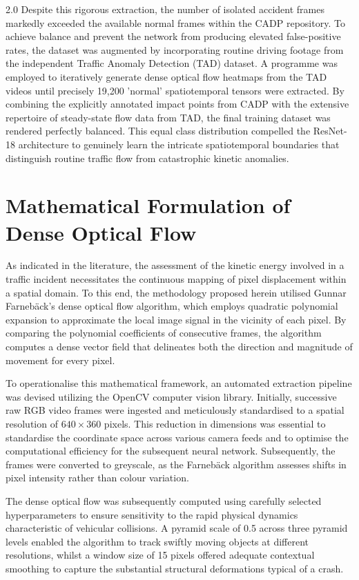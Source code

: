 \begin{spacing}{2.0}
Despite this rigorous extraction, the number of isolated accident frames markedly exceeded the available normal frames within the CADP repository. To achieve balance and prevent the network from producing elevated false-positive rates, the dataset was augmented by incorporating routine driving footage from the independent Traffic Anomaly Detection (TAD) dataset. A programme was employed to iteratively generate dense optical flow heatmaps from the TAD videos until precisely 19,200 'normal' spatiotemporal tensors were extracted. By combining the explicitly annotated impact points from CADP with the extensive repertoire of steady-state flow data from TAD, the final training dataset was rendered perfectly balanced. This equal class distribution compelled the ResNet-18 architecture to genuinely learn the intricate spatiotemporal boundaries that distinguish routine traffic flow from catastrophic kinetic anomalies.

\section{Mathematical Formulation of Dense Optical Flow}
As indicated in the literature, the assessment of the kinetic energy involved in a traffic incident necessitates the continuous mapping of pixel displacement within a spatial domain. To this end, the methodology proposed herein utilised Gunnar Farnebäck’s dense optical flow algorithm, which employs quadratic polynomial expansion to approximate the local image signal in the vicinity of each pixel. By comparing the polynomial coefficients of consecutive frames, the algorithm computes a dense vector field that delineates both the direction and magnitude of movement for every pixel.

To operationalise this mathematical framework, an automated extraction pipeline was devised utilizing the OpenCV computer vision library. Initially, successive raw RGB video frames were ingested and meticulously standardised to a spatial resolution of $640 \times 360$ pixels. This reduction in dimensions was essential to standardise the coordinate space across various camera feeds and to optimise the computational efficiency for the subsequent neural network. Subsequently, the frames were converted to greyscale, as the Farnebäck algorithm assesses shifts in pixel intensity rather than colour variation.

The dense optical flow was subsequently computed using carefully selected hyperparameters to ensure sensitivity to the rapid physical dynamics characteristic of vehicular collisions. A pyramid scale of 0.5 across three pyramid levels enabled the algorithm to track swiftly moving objects at different resolutions, whilst a window size of 15 pixels offered adequate contextual smoothing to capture the substantial structural deformations typical of a crash.


\end{spacing}
